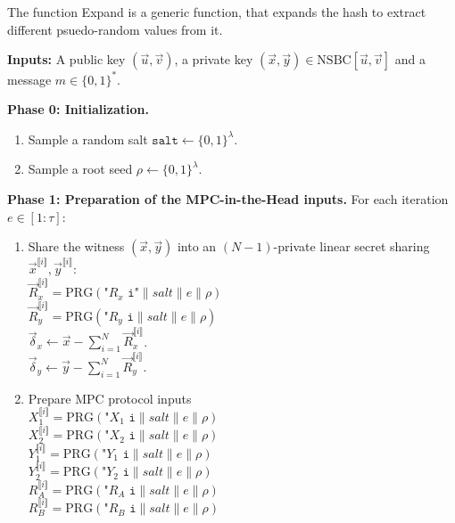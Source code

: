 \documentclass[english]{article}
\newcommand{\lir}{\llbracket i \rrbracket}
\begin{document}
	The function Expand is a generic function, that expands the hash to extract different psuedo-random values from it.
		
		\begin{tcolorbox}[title=Protocol 1: Signature scheme - Signing Algorithm, breakable, enhanced, colback=white, colframe=black]\label{Protocol_sig}
			\textbf{Inputs:} A public key $(\vec{u}, \vec{v})$, a private key $(\vec{x}, \vec{y}) \in \text{NSBC}[\vec{u}, \vec{v}]$ and a message $m \in \{0,1\}^*$.
			
			\vspace{0.5em}
			\textbf{Phase 0: Initialization.}
			\begin{enumerate}[label=\arabic*.]
				\item Sample a random salt $\texttt{salt} \leftarrow \{0,1\}^{\lambda}$.
				\item Sample a root seed $\rho \leftarrow \{0,1\}^{\lambda}$.
			\end{enumerate}
			
			\vspace{0.5em}
			\textbf{Phase 1: Preparation of the MPC-in-the-Head inputs.} For each iteration $e \in [1:\tau]$:
			\begin{enumerate}[label=\arabic*.]				
				\item Share the witness $(\vec{x},\vec{y})$ into an $(N-1)$-private linear secret sharing $\vec{x}^{\lir}, \vec{y}^{\lir}$: \\
				\quad $\vec{R}_x^{\lir} = \text{PRG}(\texttt{"$R_x$ i"} \parallel salt \parallel e \parallel \rho)$ \\
				\quad $\vec{R}_y^{\lir} = \text{PRG}(\texttt{"$R_y$ i}\parallel salt \parallel e \parallel \rho)$ \\
				\quad $\vec{\delta}_x \leftarrow \vec{x} - \sum_{i=1}^{N} \vec{R}_x^{\lir}$. \\
				\quad $\vec{\delta}_y \leftarrow \vec{y} - \sum_{i=1}^{N} \vec{R}_y^{\lir}$.
				
				\item Prepare MPC protocol inputs\\
				\quad $X_1^{\lir} = \text{PRG}(\texttt{"$X_1$ i}\parallel salt \parallel e \parallel \rho)$ \\
				\quad $X_2^{\lir} = \text{PRG}(\texttt{"$X_2$ i}\parallel salt \parallel e \parallel \rho)$ \\
				\quad $Y_1^{\lir} = \text{PRG}(\texttt{"$Y_1$ i}\parallel salt \parallel e \parallel \rho)$ \\
				\quad $Y_2^{\lir} = \text{PRG}(\texttt{"$Y_2$ i}\parallel salt \parallel e \parallel \rho)$ \\
				\quad $R_A^{\lir} = \text{PRG}(\texttt{"$R_A$ i}\parallel salt \parallel e \parallel \rho)$ \\
				\quad $R_B^{\lir} = \text{PRG}(\texttt{"$R_B$ i}\parallel salt \parallel e \parallel \rho)$ \\
				

\end{enumerate}
\end{tcolorbox}
\end{document}
